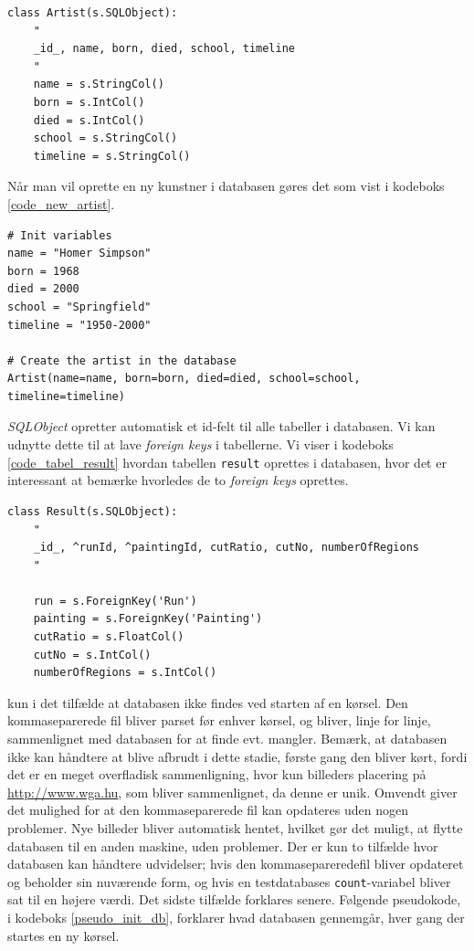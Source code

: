 {\begin{lstlisting}[caption={Pythonkode for oprettelse af tabeller i
    databasen.}, captionpos=b, label={code_tabel_artist}, frame=tb,
    breaklines=false, float=hb]
class Artist(s.SQLObject):
    "
    _id_, name, born, died, school, timeline
    "
    name = s.StringCol()
    born = s.IntCol()
    died = s.IntCol()
    school = s.StringCol()
    timeline = s.StringCol()
\end{lstlisting}

Når man vil oprette en ny kunstner i databasen gøres det som vist
i kodeboks \ref{code_new_artist}.

\begin{lstlisting}[caption={Oprettelse af en kunstner i databasen.},
    captionpos=b, label={code_new_artist}, frame=tb, breaklines=false,
    float=h]
# Init variables
name = "Homer Simpson"
born = 1968
died = 2000
school = "Springfield"
timeline = "1950-2000"

# Create the artist in the database
Artist(name=name, born=born, died=died, school=school, timeline=timeline)
\end{lstlisting}

\emph{SQLObject} opretter automatisk et id-felt til alle tabeller i
databasen. Vi kan udnytte dette til at lave \emph{foreign keys} i
tabellerne. Vi viser i kodeboks \ref{code_tabel_result} hvordan tabellen
\texttt{result} oprettes i databasen, hvor det er interessant at bemærke
hvorledes de to \emph{foreign keys} oprettes.

\begin{lstlisting}[caption={Pythonkode for oprettelse af \emph{foreign
    keys} i databasen.}, captionpos=b, label={code_tabel_result}, frame=tb,
    breaklines=false, float=h]
class Result(s.SQLObject):
    "
    _id_, ^runId, ^paintingId, cutRatio, cutNo, numberOfRegions
    "

    run = s.ForeignKey('Run')
    painting = s.ForeignKey('Painting')
    cutRatio = s.FloatCol()
    cutNo = s.IntCol()
    numberOfRegions = s.IntCol()
\end{lstlisting}

 kun i det tilfælde at databasen ikke
findes ved starten af en kørsel. Den kommaseparerede fil bliver parset
før enhver kørsel, og bliver, linje for linje, sammenlignet med
databasen for at finde evt. mangler.  Bemærk, at databasen ikke kan
håndtere at blive afbrudt i dette stadie, første gang den bliver kørt,
fordi det er en meget overfladisk sammenligning, hvor kun billeders
placering på \url{http://www.wga.hu}, som bliver sammenlignet, da denne
er unik.  Omvendt giver det mulighed for at den kommaseparerede fil kan
opdateres uden nogen problemer. Nye billeder bliver automatisk hentet,
hvilket gør det muligt, at flytte databasen til en anden maskine, uden
problemer. Der er kun to tilfælde hvor databasen kan håndtere
udvidelser; hvis den kommasepareredefil bliver opdateret og beholder sin
nuværende form, og hvis en testdatabases \texttt{count}-variabel bliver
sat til en højere værdi. Det sidste tilfælde forklares senere.  Følgende
pseudokode, i kodeboks \ref{pseudo_init_db}, forklarer hvad databasen
gennemgår, hver gang der startes en ny kørsel.

}
